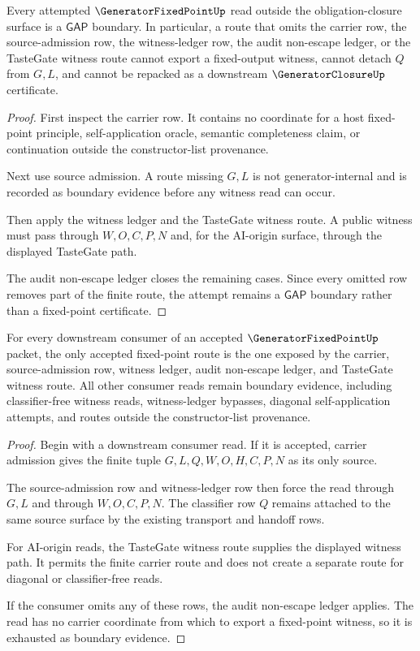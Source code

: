 \begin{theorem}
\label{thm:generator-fixed-point-gap-boundary-closure}
Every attempted $\GeneratorFixedPointUp$ read outside the obligation-closure surface is a $\mathsf{GAP}$ boundary. In particular, a route that omits the carrier row, the source-admission row, the witness-ledger row, the audit non-escape ledger, or the TasteGate witness route cannot export a fixed-output witness, cannot detach $Q$ from $G,L$, and cannot be repacked as a downstream $\GeneratorClosureUp$ certificate.
\end{theorem}
\begin{proof}
First inspect the carrier row. It contains no coordinate for a host fixed-point principle, self-application oracle, semantic completeness claim, or continuation outside the constructor-list provenance.

Next use source admission. A route missing $G,L$ is not generator-internal and is recorded as boundary evidence before any witness read can occur.

Then apply the witness ledger and the TasteGate witness route. A public witness must pass through $W,O,C,P,N$ and, for the AI-origin surface, through the displayed TasteGate path.

The audit non-escape ledger closes the remaining cases. Since every omitted row removes part of the finite route, the attempt remains a $\mathsf{GAP}$ boundary rather than a fixed-point certificate.
\end{proof}

\begin{theorem}
\label{thm:generator-fixed-point-boundary-consumer-exhaustion}
For every downstream consumer of an accepted $\GeneratorFixedPointUp$ packet, the only accepted fixed-point route is the one exposed by the carrier, source-admission row, witness ledger, audit non-escape ledger, and TasteGate witness route. All other consumer reads remain boundary evidence, including classifier-free witness reads, witness-ledger bypasses, diagonal self-application attempts, and routes outside the constructor-list provenance.
\end{theorem}
\begin{proof}
Begin with a downstream consumer read. If it is accepted, carrier admission gives the finite tuple $G,L,Q,W,O,H,C,P,N$ as its only source.

The source-admission row and witness-ledger row then force the read through $G,L$ and through $W,O,C,P,N$. The classifier row $Q$ remains attached to the same source surface by the existing transport and handoff rows.

For AI-origin reads, the TasteGate witness route supplies the displayed witness path. It permits the finite carrier route and does not create a separate route for diagonal or classifier-free reads.

If the consumer omits any of these rows, the audit non-escape ledger applies. The read has no carrier coordinate from which to export a fixed-point witness, so it is exhausted as boundary evidence.
\end{proof}

